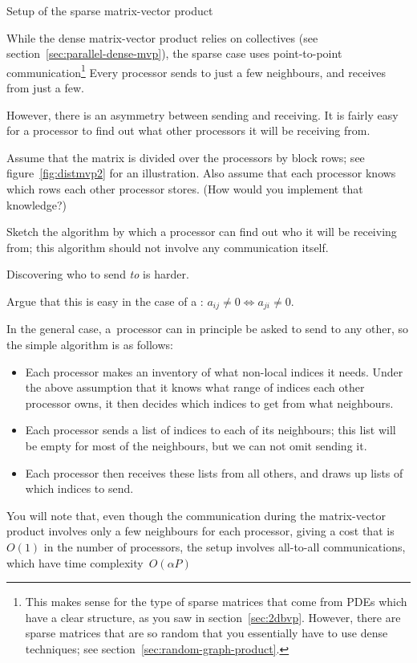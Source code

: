  {Setup of the sparse matrix-vector product}
\label{sec:par-spmvp-setup}

While the dense matrix-vector product relies on collectives
(see section~\ref{sec:parallel-dense-mvp}),
the sparse case uses point-to-point communication\footnote
{This makes sense for the type of sparse matrices
that come from \acp{PDE}
which have a clear structure, as you saw 
in section~\ref{sec:2dbvp}. However, there are 
sparse matrices that are so random that you essentially
have to use dense techniques; see section~\ref{sec:random-graph-product}.}
%
Every processor sends to just a few neighbours, and receives
from just a few.

However, there is an asymmetry between sending and receiving.
It is fairly easy for a processor to find out what other processors
it will be receiving from.

\begin{exercise}
  Assume that the matrix is divided over the processors by block rows;
  see figure~\ref{fig:distmvp2} for an illustration. Also assume that each processor
  knows which rows each other processor stores. (How would you implement that knowledge?)

  Sketch the algorithm by which a processor can find out who it will
  be receiving from; this algorithm should not involve any
  communication itself.
\end{exercise}

Discovering who to send \emph{to} is harder.

\begin{exercise}
  Argue that this is easy in the case of a 
  :
  $a_{ij}\not=0\Leftrightarrow a_{ji}\not=0$.
\end{exercise}

In the general case, a~processor can in principle be asked to send to any other,
so the simple algorithm is as follows:
\begin{itemize}
\item Each processor makes an inventory of what non-local indices it
  needs. Under the above assumption that it knows what range of indices each
  other processor owns, it then decides which indices to get from what
  neighbours.
\item Each processor sends a list of indices to each of its
  neighbours; this list will be empty for most of the neighbours, but
  we can not omit sending it.
\item Each processor then receives these lists from all others, and
  draws up lists of which indices to send.
\end{itemize}
You will note that, even though the communication during the
matrix-vector product involves only a few neighbours for each
processor, giving a cost that is $O(1)$ in the number of processors,
the setup involves all-to-all communications, which 
have time complexity~$O(\alpha P)$

